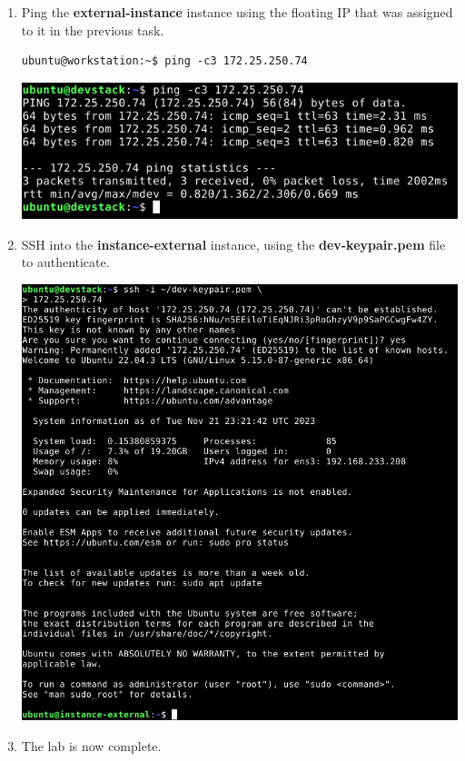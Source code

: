 \documentclass[letterpaper, 12pt]{article}
\begin{document}
\begin{enumerate}
    \item Ping the \textbf{external-instance} instance using the floating IP that was assigned to it in the previous
    task.
\begin{lstlisting}
ubuntu@workstation:~$ ping -c3 172.25.250.74
\end{lstlisting}

    \begin{center}
        \includegraphics[width=\linewidth]{images/part6/step4.png}
    \end{center}

    \item SSH into the \textbf{instance-external} instance, using the \textbf{dev-keypair.pem} file to authenticate.

    \begin{center}
        \includegraphics[width=\linewidth]{images/part6/step5.png}
    \end{center}

    \item The lab is now complete.

\end{enumerate}
\end{document}
